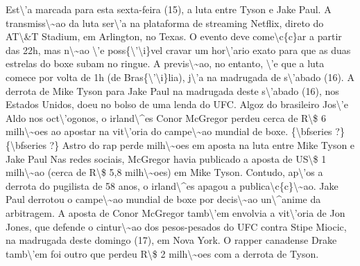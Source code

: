 \documentclass{article}%
\begin{document}
\newline%
Est\textbackslash{}'a marcada para esta sexta{-}feira (15), a luta entre Tyson e Jake Paul. A transmiss\textbackslash{}\textasciitilde{}ao da luta ser\textbackslash{}'a na plataforma de streaming Netflix, direto do AT\textbackslash{}\&T Stadium, em Arlington, no Texas.\newline%
\newline%
O evento deve come\textbackslash{}c\{c\}ar a partir das 22h, mas n\textbackslash{}\textasciitilde{}ao \textbackslash{}'e poss\{\textbackslash{}'\textbackslash{}i\}vel cravar um hor\textbackslash{}'ario exato para que as duas estrelas do boxe subam no ringue. A previs\textbackslash{}\textasciitilde{}ao, no entanto, \textbackslash{}'e que a luta comece por volta de 1h (de Bras\{\textbackslash{}'\textbackslash{}i\}lia), j\textbackslash{}'a na madrugada de s\textbackslash{}'abado (16). A derrota de Mike Tyson para Jake Paul na madrugada deste s\textbackslash{}'abado (16), nos Estados Unidos, doeu no bolso de uma lenda do UFC. Algoz do brasileiro Jos\textbackslash{}'e Aldo nos oct\textbackslash{}'ogonos, o irland\textbackslash{}\^{}es Conor McGregor perdeu cerca de R\textbackslash{}\$ 6 milh\textbackslash{}\textasciitilde{}oes ao apostar na vit\textbackslash{}'oria do campe\textbackslash{}\textasciitilde{}ao mundial de boxe.\newline%
\newline%
\{\textbackslash{}bfseries ?\}\{\textbackslash{}bfseries ?\} Astro do rap perde milh\textbackslash{}\textasciitilde{}oes em aposta na luta entre Mike Tyson e Jake Paul\newline%
\newline%
Nas redes sociais, McGregor havia publicado a aposta de US\textbackslash{}\$ 1 milh\textbackslash{}\textasciitilde{}ao (cerca de R\textbackslash{}\$ 5,8 milh\textbackslash{}\textasciitilde{}oes) em Mike Tyson. Contudo, ap\textbackslash{}'os a derrota do pugilista de 58 anos, o irland\textbackslash{}\^{}es apagou a publica\textbackslash{}c\{c\}\textbackslash{}\textasciitilde{}ao. Jake Paul derrotou o campe\textbackslash{}\textasciitilde{}ao mundial de boxe por decis\textbackslash{}\textasciitilde{}ao un\textbackslash{}\^{}anime da arbitragem.\newline%
\newline%
A aposta de Conor McGregor tamb\textbackslash{}'em envolvia a vit\textbackslash{}'oria de Jon Jones, que defende o cintur\textbackslash{}\textasciitilde{}ao dos pesos{-}pesados do UFC contra Stipe Miocic, na madrugada deste domingo (17), em Nova York. O rapper canadense Drake tamb\textbackslash{}'em foi outro que perdeu R\textbackslash{}\$ 2 milh\textbackslash{}\textasciitilde{}oes com a derrota de Tyson.\newline%
\end{document}
